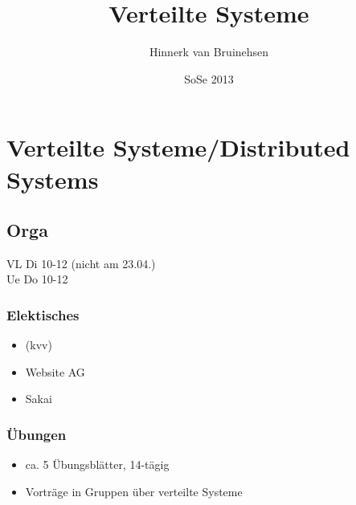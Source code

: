 \documentclass[ngerman,a4paper]{report}
\author{Hinnerk van Bruinehsen}
\title{Verteilte Systeme}
\date{SoSe 2013}
\renewcommand{\maketitle}{}
\begin{document}
\maketitle

\section{Verteilte Systeme/Distributed Systems}
\subsection{Orga}
VL Di 10-12 (nicht am 23.04.)\\
Ue Do 10-12\\

\subsubsection{Elektisches}
\begin{itemize}
\item (kvv)
\item Website AG
\item Sakai
\end{itemize}

\subsubsection{Übungen}

\begin{itemize}
\item ca. 5 Übungsblätter, 14-tägig
\item Vorträge in Gruppen über \glqq verteilte Systeme\grqq
\end{itemize}
\end{document}
